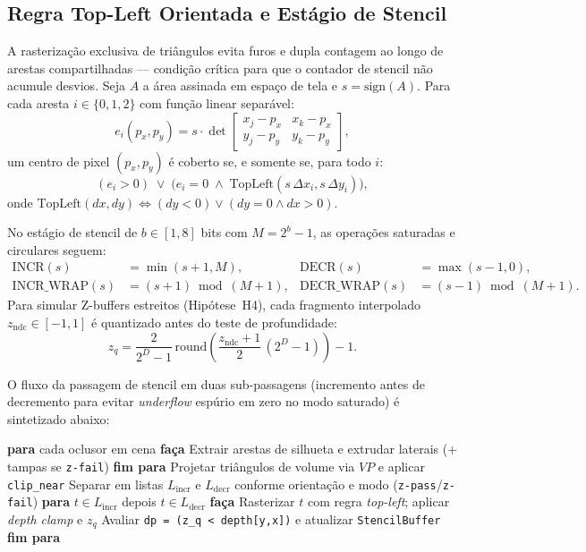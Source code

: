 \documentclass[conference]{IEEEtran}
\begin{document}
\subsection{Regra Top-Left Orientada e Estágio de Stencil}

A rasterização exclusiva de triângulos evita furos e dupla contagem ao longo de arestas compartilhadas --- condição crítica para que o contador de stencil não acumule desvios. Seja $A$ a área assinada em espaço de tela e $s = \text{sign}(A)$. Para cada aresta $i \in \{0,1,2\}$ com função linear separável:
\begin{equation}
e_i(p_x, p_y) = s \cdot \det\begin{bmatrix} x_j - p_x & x_k - p_x \\ y_j - p_y & y_k - p_y \end{bmatrix},
\end{equation}
um centro de pixel $(p_x, p_y)$ é coberto se, e somente se, para todo $i$:
\begin{equation}
(e_i > 0) \;\lor\; \bigl(e_i = 0 \;\land\; \text{TopLeft}(s\,\Delta x_i, s\,\Delta y_i)\bigr),
\end{equation}
onde $\text{TopLeft}(dx, dy) \iff (dy < 0) \lor (dy = 0 \land dx > 0)$.

No estágio de stencil de $b \in [1, 8]$ bits com $M = 2^b - 1$, as operações saturadas e circulares seguem:
\begin{align}
\text{INCR}(s) &= \min(s + 1, M), & \text{DECR}(s) &= \max(s - 1, 0), \\
\text{INCR\_WRAP}(s) &= (s + 1) \bmod (M + 1), & \text{DECR\_WRAP}(s) &= (s - 1) \bmod (M + 1).
\end{align}
Para simular Z-buffers estreitos (Hipótese~H4), cada fragmento interpolado $z_{\text{ndc}} \in [-1, 1]$ é quantizado antes do teste de profundidade:
\begin{equation}
z_q = \frac{2}{2^D - 1}\,\text{round}\!\left(\frac{z_{\text{ndc}} + 1}{2}\,(2^D - 1)\right) - 1.
\end{equation}

O fluxo da passagem de stencil em duas sub-passagens (incremento antes de decremento para evitar \textit{underflow} espúrio em zero no modo saturado) é sintetizado abaixo:
\begin{algorithmic}[1]
\STATE \textbf{para} cada oclusor em cena \textbf{faça}
\STATE \quad Extrair arestas de silhueta e extrudar laterais (+ tampas se \texttt{z-fail})
\STATE \textbf{fim para}
\STATE Projetar triângulos de volume via $VP$ e aplicar \texttt{clip\_near}
\STATE Separar em listas $L_{\text{incr}}$ e $L_{\text{decr}}$ conforme orientação e modo (\texttt{z-pass}/\texttt{z-fail})
\STATE \textbf{para} $t \in L_{\text{incr}}$ depois $t \in L_{\text{decr}}$ \textbf{faça}
\STATE \quad Rasterizar $t$ com regra \textit{top-left}; aplicar \textit{depth clamp} e $z_q$
\STATE \quad Avaliar \texttt{dp = (z\_q < depth[y,x])} e atualizar \texttt{StencilBuffer}
\STATE \textbf{fim para}
\end{algorithmic}
\end{document}

